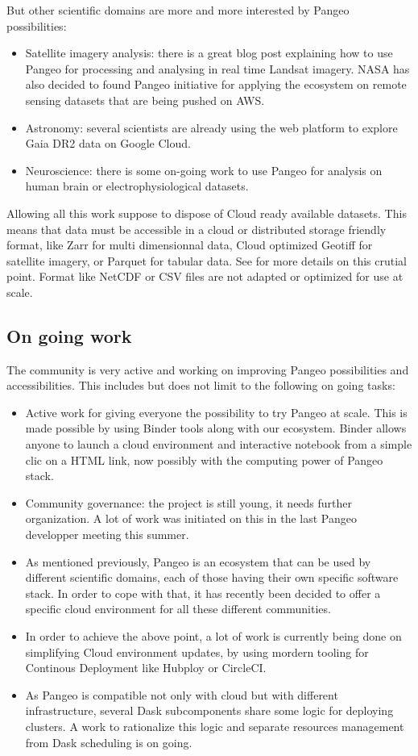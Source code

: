 \documentclass{article}
\begin{document}
But other scientific domains are more and more interested by Pangeo possibilities:
\begin{itemize}
\item Satellite imagery analysis: there is a great blog post\cite{b6} explaining how to use Pangeo for processing and analysing in real time Landsat imagery. NASA has also decided to found Pangeo initiative for applying the ecosystem on remote sensing datasets that are being pushed on AWS.
\item Astronomy: several scientists are already using the web platform to explore Gaia DR2 data on Google Cloud.
\item Neuroscience: there is some on-going work to use Pangeo for analysis on human brain or electrophysiological datasets.
\end{itemize}

Allowing all this work suppose to dispose of Cloud ready available datasets. This means that data must be accessible in a cloud or distributed storage friendly format, like Zarr for multi dimensionnal data, Cloud optimized Geotiff for satellite imagery, or Parquet for tabular data. See \cite{b7} for more details on this crutial point. Format like NetCDF or CSV files are not adapted or optimized for use at scale.

\subsection{On going work}
\label{ssec:ongowork}

The community is very active and working on improving Pangeo possibilities and accessibilities. This includes but does not limit to the following on going tasks:
\begin{itemize}
\item Active work for giving everyone the possibility to try Pangeo at scale. This is made possible by using Binder tools along with our ecosystem\cite{b8}. Binder allows anyone to launch a cloud environment and interactive notebook from a simple clic on a HTML link, now possibly with the computing power of Pangeo stack.
\item Community governance: the project is still young, it needs further organization. A lot of work was initiated on this in the last Pangeo developper meeting this summer.
\item As mentioned previously, Pangeo is an ecosystem that can be used by different scientific domains, each of those having their own specific software stack. In order to cope with that, it has recently been decided to offer a specific cloud environment for all these different communities.
\item In order to achieve the above point, a lot of work is currently being done on simplifying Cloud environment updates, by using mordern tooling for Continous Deployment like Hubploy or CircleCI.
\item As Pangeo is compatible not only with cloud but with different infrastructure, several Dask subcomponents share some logic for deploying clusters. A work to rationalize this logic and separate resources management from Dask scheduling is on going.
\end{itemize}
\end{document}
